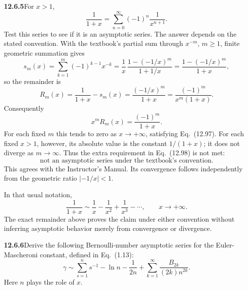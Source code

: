 \par\bigskip
\noindent\textbf{12.6.5}\quad For $x>1$,
\[
\frac{1}{1+x}=\sum_{n=0}^{\infty}(-1)^{n}\frac{1}{x^{n+1}}.
\]
Test this series to see if it is an asymptotic series.
\solution
The answer depends on the stated convention. With the textbook's partial
sum through $x^{-m}$, $m\ge1$, finite geometric summation gives
\[
s_m(x)=\sum_{k=1}^m(-1)^{k-1}x^{-k}
=\frac1x\,\frac{1-(-1/x)^m}{1+1/x}
=\frac{1-(-1/x)^m}{1+x},
\]
so the remainder is
\[
R_m(x)=\frac1{1+x}-s_m(x)=\frac{(-1/x)^m}{1+x}
=\frac{(-1)^m}{x^m(1+x)}.
\]
Consequently
\[
x^mR_m(x)=\frac{(-1)^m}{1+x}.
\]
For each fixed $m$ this tends to zero as $x\to+\infty$, satisfying
Eq.~(12.97). For each fixed $x>1$, however, its absolute value is the
constant $1/(1+x)$; it does not diverge as $m\to\infty$.
Thus the extra requirement in Eq.~(12.98) is not met:
\[
\boxed{\text{not an asymptotic series under the textbook's convention}.}
\]
This agrees with the Instructor's Manual. Its convergence follows
independently from the geometric ratio $|-1/x|<1$.

In that usual notation,
\[
\frac1{1+x}\sim\frac1x-\frac1{x^2}+\frac1{x^3}-\cdots,\qquad x\to+\infty.
\]
The exact remainder above proves the claim under either convention
without inferring asymptotic behavior merely from convergence or divergence.

\par\bigskip
\noindent\textbf{12.6.6}\quad Derive the following Bernoulli-number asymptotic
series for the Euler-Mascheroni constant, defined in Eq.~(1.13):
\[
\gamma\sim\sum_{s=1}^{n}s^{-1}-\ln n-\frac{1}{2n}
+\sum_{k=1}^{\infty}\frac{B_{2k}}{(2k)n^{2k}}.
\]
Here $n$ plays the role of $x$.

